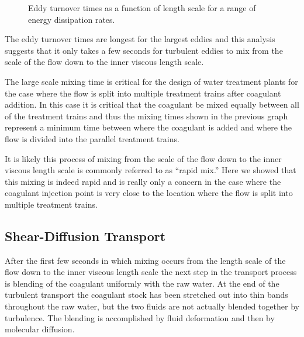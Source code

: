 \documentclass[letterpaper,10pt,english]{sphinxmanual}
\let\sphinxpxdimen\pdfpxdimen\else\newdimen\sphinxpxdimen
\begin{document}
\begin{figure}[htbp]
\centering
\capstart

\noindent\sphinxincludegraphics[width=400\sphinxpxdimen]{{Eddy_turnover_time}.png}
\caption{Eddy turnover times as a function of length scale for a range of energy dissipation rates.}\label{\detokenize{Rapid_Mix/RM_Theory_and_Future_Work:id2}}\label{\detokenize{Rapid_Mix/RM_Theory_and_Future_Work:figure-eddy-turnover-times}}\end{figure}

The eddy turnover times are longest for the largest eddies and this analysis suggests that it only takes a few seconds for turbulent eddies to mix from the scale of the flow down to the inner viscous length scale.

The large scale mixing time is critical for the design of water treatment plants for the case where the flow is split into multiple treatment trains after coagulant addition. In this case it is critical that the coagulant be mixed equally between all of the treatment trains and thus the mixing times shown in the previous graph represent a minimum time between where the coagulant is added and where the flow is divided into the parallel treatment trains.

It is likely this process of mixing from the scale of the flow down to the inner viscous length scale is commonly referred to as “rapid mix.” Here we showed that this mixing is indeed rapid and is really only a concern in the case where the coagulant injection point is very close to the location where the flow is split into multiple treatment trains.


\subsection{Shear-Diffusion Transport}
\label{\detokenize{Rapid_Mix/RM_Theory_and_Future_Work:shear-diffusion-transport}}\label{\detokenize{Rapid_Mix/RM_Theory_and_Future_Work:heading-shear-diffusion-transport}}
After the first few seconds in which mixing occurs from the length scale of the flow down to the inner viscous length scale the next step in the transport process is blending of the coagulant uniformly with the raw water. At the end of the turbulent transport the coagulant stock has been stretched out into thin bands throughout the raw water, but the two fluids are not actually blended together by turbulence. The blending is accomplished by fluid deformation and then by molecular diffusion.
\end{document}
